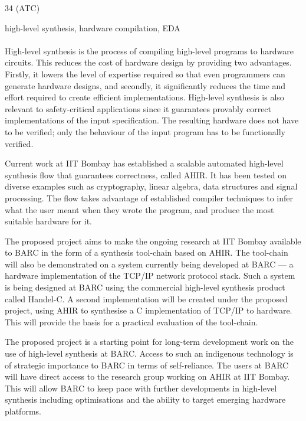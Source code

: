 \documentclass[12pt]{article}
\begin{document}
 34 (ATC)

\begin{center}
  \large\mytitle
\end{center}

 high-level synthesis, hardware compilation, EDA


\paragraph{} High-level synthesis is the process of compiling
high-level programs to hardware circuits. This reduces the cost of
hardware design by providing two advantages. Firstly, it lowers the
level of expertise required so that even programmers can generate
hardware designs, and secondly, it significantly reduces the time and
effort required to create efficient implementations. High-level
synthesis is also relevant to safety-critical applications since it
guarantees provably correct implementations of the input
specification. The resulting hardware does not have to be verified;
only the behaviour of the input program has to be functionally
verified.

Current work at IIT Bombay has established a scalable automated
high-level synthesis flow that guarantees correctness, called AHIR. It
has been tested on diverse examples such as cryptography, linear
algebra, data structures and signal processing. The flow takes
advantage of established compiler techniques to infer what the user
meant when they wrote the program, and produce the most suitable
hardware for it.

The proposed project aims to make the ongoing research at IIT Bombay
available to BARC in the form of a synthesis tool-chain based on AHIR.
The tool-chain will also be demonstrated on a system currently being
developed at BARC --- a hardware implementation of the TCP/IP network
protocol stack. Such a system is being designed at BARC using the
commercial high-level synthesis product called Handel-C. A second
implementation will be created under the proposed project, using AHIR
to synthesise a C implementation of TCP/IP to hardware. This will
provide the basis for a practical evaluation of the tool-chain.

The proposed project is a starting point for long-term development
work on the use of high-level synthesis at BARC. Access to such an
indigenous technology is of strategic importance to BARC in terms of
self-reliance. The users at BARC will have direct access to the
research group working on AHIR at IIT Bombay. This will allow BARC to
keep pace with further developments in high-level synthesis including
optimisations and the ability to target emerging hardware platforms.
\end{document}

